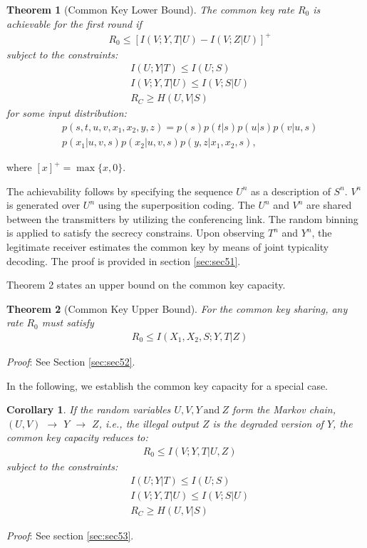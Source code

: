 \documentclass[conference,8pt]{IEEEtran}
\newtheorem{th1}{Theorem}
\newtheorem{corollary}{Corollary}
\begin{document}
{{{\begin{th1}[Common Key Lower Bound]
The common key rate $R_0$ is achievable for the first round if 
\begin{align}
&R_0 \leq [I(V;Y,T|U)-I(V;Z|U)]^+
\end{align}
subject to the constraints:
\begin{align}
&I(U;Y|T) \leq I(U;S) \\
&I(V;Y,T|U) \leq I(V;S|U) \\
&R_C  \geq H(U,V|S)
\end{align}
for some input distribution:
\begin{align}
&p(s,t,u,v,x_1,x_2,y,z)=p(s)p(t|s)p(u|s)p(v|u,s) \nonumber \\
&p(x_1|u,v,s)p(x_2|u,v,s)p(y,z|x_1,x_2,s),
\end{align}
\end{th1}where ${[x]^+=\max \{ x,0\}}$.

\begin{IEEEproof}The achievability follows by specifying the sequence $U^n$ as a description of $S^n$. $V^n$ is generated over $U^n$ using the superposition coding. The $U^n$ and $V^n$ are shared between the transmitters by utilizing the conferencing link. The random binning is applied to satisfy the secrecy constrains. Upon observing $T^n$ and $Y^n$, the legitimate receiver estimates the common key by means of joint typicality decoding. The proof is provided in section \ref{sec:sec51}. 
\end{IEEEproof}Theorem 2 states an upper bound on the common key capacity.

\begin{th1}[Common Key Upper Bound]
For the common key sharing, any rate $R_0$ must satisfy
\begin{align}
&R_0 \leq I(X_1,X_2,S;Y,T|Z)
\end{align}
\end{th1}
\emph{Proof}: See Section \ref{sec:sec52}.

In the following, we establish the common key capacity for a special case.

\begin{corollary}
If the random variables $U, V, Y \ \text{and} \ Z$ form the Markov chain, $(U,V)$ $\rightarrow$ $Y$ $\rightarrow$ $Z$, i.e., the illegal output $Z$ is the degraded version of $Y$, the common key capacity reduces to:
\begin{align}
&R_0 \leq I(V;Y,T|U,Z)
\end{align}
subject to the constraints:
\begin{align}
&I(U;Y|T) \leq I(U;S) \\  
&I(V;Y,T|U) \leq I(V;S|U) \\ 
&R_C  \geq H(U,V|S)
\end{align}
\end{corollary}
\emph{Proof}: See section \ref{sec:sec53}.

}}}
\end{document}
